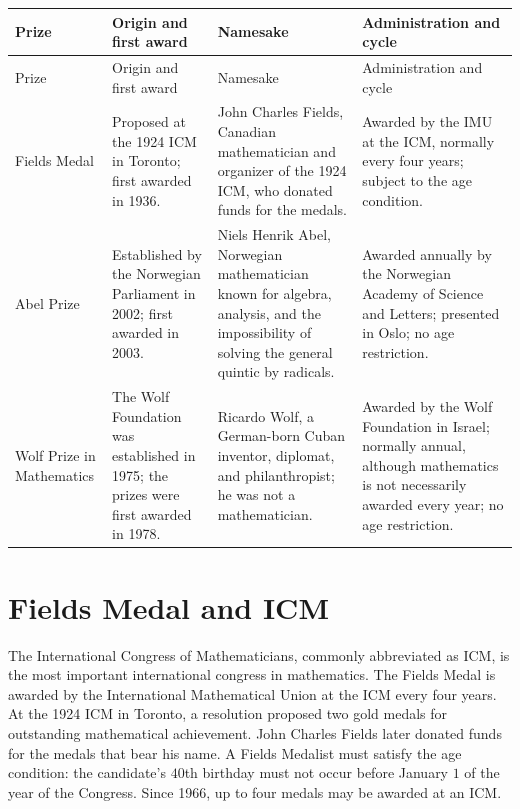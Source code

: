     {\small
    \renewcommand{\arraystretch}{1.18}
    \begin{longtable}{@{}L{0.16\textwidth}L{0.20\textwidth}L{0.27\textwidth}L{0.29\textwidth}@{}}
        \toprule
        Prize & Origin and first award & Namesake & Administration and cycle \\
        \midrule
        \endfirsthead

        \toprule
        Prize & Origin and first award & Namesake & Administration and cycle \\
        \midrule
        \endhead

        \bottomrule
        \endlastfoot

        Fields Medal
        & Proposed at the 1924 ICM in Toronto; first awarded in 1936.
        & John Charles Fields, Canadian mathematician and organizer of the 1924 ICM,
          who donated funds for the medals.
        & Awarded by the IMU at the ICM, normally every four years; subject to
          the age condition. \\

        Abel Prize
        & Established by the Norwegian Parliament in 2002; first awarded in
          2003.
        & Niels Henrik Abel, Norwegian mathematician known for algebra,
          analysis, and the impossibility of solving the general quintic by
          radicals.
        & Awarded annually by the Norwegian Academy of Science and Letters;
          presented in Oslo; no age restriction. \\

        Wolf Prize in Mathematics
        & The Wolf Foundation was established in 1975; the prizes were first
          awarded in 1978.
        & Ricardo Wolf, a German-born Cuban inventor, diplomat, and
          philanthropist; he was not a mathematician.
        & Awarded by the Wolf Foundation in Israel; normally annual, although
          mathematics is not necessarily awarded every year; no age
          restriction. \\
    \end{longtable}
    }

    \section*{Fields Medal and ICM}

    The International Congress of Mathematicians, commonly abbreviated as ICM,
    is the most important international congress in mathematics. The Fields
    Medal is awarded by the International Mathematical Union at the ICM every
    four years. At the 1924 ICM in Toronto, a resolution proposed two gold medals
    for outstanding mathematical achievement. John Charles Fields later
    donated funds for the medals that bear his name. A Fields Medalist must
    satisfy the age condition: the candidate's $40$th birthday must not occur
    before January $1$ of the year of the Congress. Since 1966, up to four
    medals may be awarded at an ICM.

